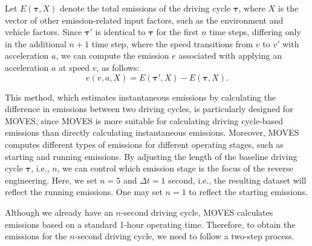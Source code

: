 \documentclass[12pt,english]{article}
\begin{document}
Let \( E(\boldsymbol{\tau}, X) \) denote the total emissions of the driving cycle \( \boldsymbol{\tau} \), where \( X \) is the vector of other emission-related input factors, such as the environment and vehicle factors.
Since \( \boldsymbol\tau' \) is identical to \( \boldsymbol\tau \) for the first \( n \) time steps, differing only in the additional \( n+1 \) time step, where the speed transitions from \( v \) to \( v' \) with acceleration \( a \), we can compute the emission $e$ associated with applying an acceleration \( a \) at speed \( v \), as follows:
\begin{equation}\label{equ:emission}
   e(v, a, X)= E(\boldsymbol\tau', X) - E(\boldsymbol\tau, X).
\end{equation}



This method, which estimates instantaneous emissions by calculating the difference in emissions between two driving cycles, is particularly designed for MOVES, since MOVES is more suitable for calculating driving cycle-based emissions than directly calculating instantaneous emissions.
Moreover, MOVES computes different types of emissions for different operating stages, such as starting and running emissions. 
By adjusting the length of the baseline driving cycle \( \boldsymbol{\tau} \), i.e., \( n \), we can control which emission stage is the focus of the reverse engineering.
Here, we set $n=5$ and $\Delta t=1$ second, i.e., the resulting dataset will reflect the running emissions.
One may set $n=1$ to reflect the starting emissions.




Although we already have an $n$-second driving cycle, MOVES calculates emissions based on a standard 1-hour operating time. Therefore, to obtain the emissions for the $n$-second driving cycle, we need to follow a two-step process.
\end{document}
